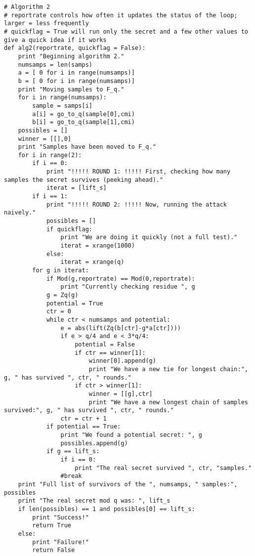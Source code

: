 \documentclass{llncs}
\newcommand{\<}{\langle}
\renewcommand{\>}{\rangle}
\begin{document}
\begin{verbatim}
# Algorithm 2
# reportrate controls how often it updates the status of the loop; larger = less frequently
# quickflag = True will run only the secret and a few other values to give a quick idea if it works
def alg2(reportrate, quickflag = False):
    print "Beginning algorithm 2."
    numsamps = len(samps)
    a = [ 0 for i in range(numsamps)]
    b = [ 0 for i in range(numsamps)]
    print "Moving samples to F_q."
    for i in range(numsamps):
        sample = samps[i]
        a[i] = go_to_q(sample[0],cmi)
        b[i] = go_to_q(sample[1],cmi)
    possibles = []
    winner = [[],0]
    print "Samples have been moved to F_q."
    for i in range(2):
        if i == 0:
            print "!!!!! ROUND 1: !!!!! First, checking how many samples the secret survives (peeking ahead)."
            iterat = [lift_s]
        if i == 1:
            print "!!!!! ROUND 2: !!!!! Now, running the attack naively."
            possibles = []
            if quickflag:
                print "We are doing it quickly (not a full test)."
                iterat = xrange(1000)
            else:
                iterat = xrange(q)
        for g in iterat:
            if Mod(g,reportrate) == Mod(0,reportrate):
                print "Currently checking residue ", g
            g = Zq(g)
            potential = True
            ctr = 0
            while ctr < numsamps and potential:
                e = abs(lift(Zq(b[ctr]-g*a[ctr])))
                if e > q/4 and e < 3*q/4:
                    potential = False
                    if ctr == winner[1]:
                        winner[0].append(g)
                        print "We have a new tie for longest chain:", g, " has survived ", ctr, " rounds."
                    if ctr > winner[1]:
                        winner = [[g],ctr]
                        print "We have a new longest chain of samples survived:", g, " has survived ", ctr, " rounds."
                ctr = ctr + 1
            if potential == True:
                print "We found a potential secret: ", g
                possibles.append(g)
            if g == lift_s:
                if i == 0:
                    print "The real secret survived ", ctr, "samples."
                #break
    print "Full list of survivors of the ", numsamps, " samples:", possibles
    print "The real secret mod q was: ", lift_s
    if len(possibles) == 1 and possibles[0] == lift_s:
        print "Success!"
        return True
    else:
        print "Failure!"
        return False


\end{verbatim}
\end{document}

